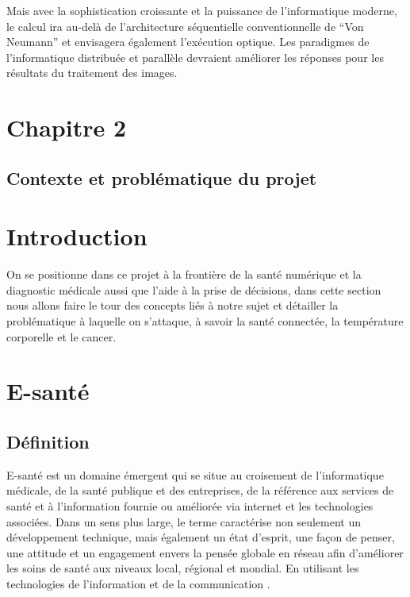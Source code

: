 \documentclass[12pt]{article}
\begin{document}
Mais avec la sophistication croissante et la puissance de l'informatique moderne, le calcul ira au-delà de l'architecture séquentielle conventionnelle de “Von Neumann” et envisagera également l'exécution optique. Les paradigmes de l'informatique distribuée et parallèle devraient améliorer les réponses pour les résultats du traitement des images.
\newpage
\rhead{}
\section*{\Huge{Chapitre 2}}
\subsection*{\huge{Contexte et problématique du projet}}
\newpage
{}\setcounter{section}{0}
\section{Introduction}
On se positionne dans ce projet à la frontière de la santé numérique et la diagnostic médicale aussi que l'aide à la prise de décisions, dans cette section nous allons faire le tour des concepts liés à notre sujet et détailler la problématique à laquelle on s'attaque, à savoir la santé connectée, la température corporelle et le cancer.  
\section{E-santé}
\subsection{Définition}
E-santé est un domaine émergent qui se situe au croisement de l'informatique médicale, de la santé publique et des entreprises, de la référence aux services de santé et à l'information fournie ou améliorée via internet et les technologies associées. Dans un sens plus large, le terme caractérise non seulement un développement technique, mais également un état d'esprit, une façon de penser, une attitude et un engagement envers la pensée globale en réseau afin d'améliorer les soins de santé aux niveaux local, régional et mondial. En utilisant les technologies de l'information et de la communication \cite{26}.
\end{document}
